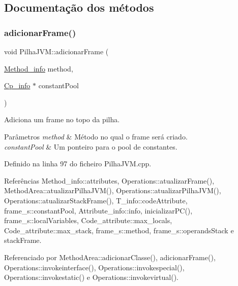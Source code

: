 \subsection{Documentação dos métodos}
\mbox{\label{classPilhaJVM_a9add990f9c258d39d2fcd791398c96ac}} 
\subsubsection{\texorpdfstring{adicionar\+Frame()}{adicionarFrame()}\hspace{0.1cm}{\footnotesize\ttfamily [1/2]}}
{\footnotesize\ttfamily void Pilha\+J\+V\+M\+::adicionar\+Frame (\begin{DoxyParamCaption}\item[{\hyperlink{structMethod__info}{Method\+\_\+info}}]{method,  }\item[{\hyperlink{structCp__info}{Cp\+\_\+info} $\ast$}]{constant\+Pool }\end{DoxyParamCaption})}



Adiciona um frame no topo da pilha. 


\begin{DoxyParams}{Parâmetros}
{\em method} & Método no qual o frame será criado. \\
\hline
{\em constant\+Pool} & Um ponteiro para o pool de constantes. \\
\hline
\end{DoxyParams}


Definido na linha 97 do ficheiro Pilha\+J\+V\+M.\+cpp.



Referências Method\+\_\+info\+::attributes, Operations\+::atualizar\+Frame(), Method\+Area\+::atualizar\+Pilha\+J\+V\+M(), Operations\+::atualizar\+Pilha\+J\+V\+M(), Operations\+::atualizar\+Stack\+Frame(), T\+\_\+info\+::code\+Attribute, frame\+\_\+s\+::constant\+Pool, Attribute\+\_\+info\+::info, inicializar\+P\+C(), frame\+\_\+s\+::local\+Variables, Code\+\_\+attribute\+::max\+\_\+locals, Code\+\_\+attribute\+::max\+\_\+stack, frame\+\_\+s\+::method, frame\+\_\+s\+::operands\+Stack e stack\+Frame.



Referenciado por Method\+Area\+::adicionar\+Classe(), adicionar\+Frame(), Operations\+::invokeinterface(), Operations\+::invokespecial(), Operations\+::invokestatic() e Operations\+::invokevirtual().

